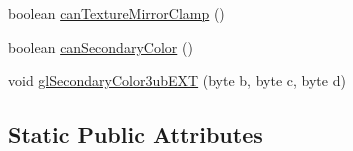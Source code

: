 \begin{DoxyCompactItemize}
\item 
boolean \mbox{\hyperlink{interfaceorg_1_1newdawn_1_1slick_1_1opengl_1_1renderer_1_1_s_g_l_a57e486bcf65ca2576b735e7b4fcd654b}{can\+Texture\+Mirror\+Clamp}} ()
\item 
boolean \mbox{\hyperlink{interfaceorg_1_1newdawn_1_1slick_1_1opengl_1_1renderer_1_1_s_g_l_a0fc936b77fc280031741e79bd4a290b1}{can\+Secondary\+Color}} ()
\item 
void \mbox{\hyperlink{interfaceorg_1_1newdawn_1_1slick_1_1opengl_1_1renderer_1_1_s_g_l_a010d3a0d76fb5b074cd31080eb17afe0}{gl\+Secondary\+Color3ub\+E\+XT}} (byte b, byte c, byte d)
\end{DoxyCompactItemize}
\subsection*{Static Public Attributes}
